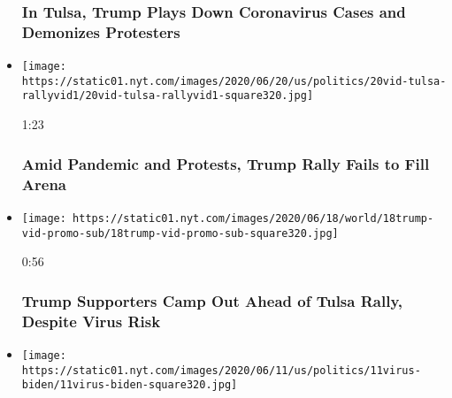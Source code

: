 \begin{itemize}
  \hypertarget{in-tulsa-trump-plays-down-coronavirus-cases-and-demonizes-protesters-2}{%
  \subsubsection{In Tulsa, Trump Plays Down Coronavirus Cases and
  Demonizes
  Protesters}\label{in-tulsa-trump-plays-down-coronavirus-cases-and-demonizes-protesters-2}}
\item
  \href{https://www.nytimes.com/video/us/politics/100000007201990/trump-supporters-gather-in-tulsa-for-rally.html?action=click\&module=video-series-bar\&region=header\&pgtype=Article\&playlistId=video/2020-Elections}{}

  \texttt{[image: https://static01.nyt.com/images/2020/06/20/us/politics/20vid-tulsa-rallyvid1/20vid-tulsa-rallyvid1-square320.jpg]}

  1:23

  \hypertarget{amid-pandemic-and-protests-trump-rally-fails-to-fill-arena}{%
  \subsubsection{Amid Pandemic and Protests, Trump Rally Fails to Fill
  Arena}\label{amid-pandemic-and-protests-trump-rally-fails-to-fill-arena}}
\item
  \href{https://www.nytimes.com/video/us/politics/100000007199618/trump-tulsa-rally-supporters-coronavirus.html?action=click\&module=video-series-bar\&region=header\&pgtype=Article\&playlistId=video/2020-Elections}{}

  \texttt{[image: https://static01.nyt.com/images/2020/06/18/world/18trump-vid-promo-sub/18trump-vid-promo-sub-square320.jpg]}

  0:56

  \hypertarget{trump-supporters-camp-out-ahead-of-tulsa-rally-despite-virus-risk}{%
  \subsubsection{Trump Supporters Camp Out Ahead of Tulsa Rally, Despite
  Virus
  Risk}\label{trump-supporters-camp-out-ahead-of-tulsa-rally-despite-virus-risk}}
\item
  \href{https://www.nytimes.com/video/us/100000007186817/biden-criticizes-trumps-reopening-of-the-economy-as-a-one-point-plan.html?action=click\&module=video-series-bar\&region=header\&pgtype=Article\&playlistId=video/2020-Elections}{}

  \texttt{[image: https://static01.nyt.com/images/2020/06/11/us/politics/11virus-biden/11virus-biden-square320.jpg]}


\end{itemize}
